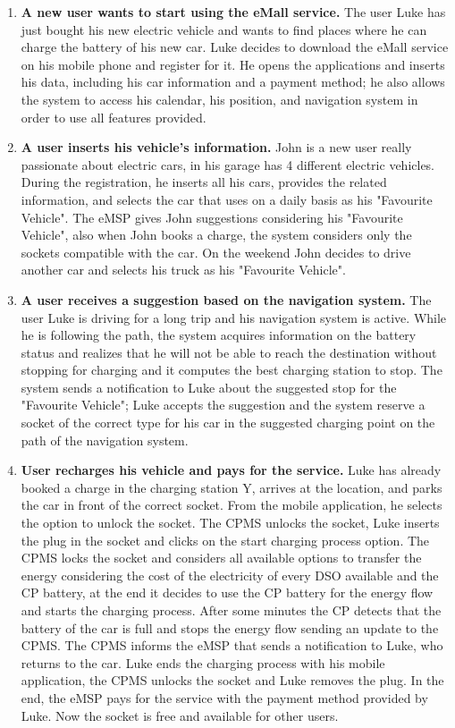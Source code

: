 \documentclass{Configuration_Files/PoliMi3i_thesis}
\begin{document}
\begin{enumerate}
    \item \textbf{A new user wants to start using the eMall service.} 
    The user Luke has just bought his new electric vehicle and wants to find places where he can charge the battery of his new car. Luke decides to download the eMall service on his mobile phone and register for it. He opens the applications and inserts his data, including his car information and a payment method; he also allows the system to access his calendar, his position, and navigation system in order to use all features provided.

    \item \textbf{A user inserts his vehicle's information.} 
    John is a new user really passionate about electric cars, in his garage has 4 different electric vehicles. During the registration, he inserts all his cars, provides the related information, and selects the car that uses on a daily basis as his "Favourite Vehicle". The eMSP gives John suggestions considering his "Favourite Vehicle", also when John books a charge, the system considers only the sockets compatible with the car. On the weekend John decides to drive another car and selects his truck as his "Favourite Vehicle".

    \item \textbf{A user receives a suggestion based on the navigation system.} \newline
    The user Luke is driving for a long trip and his navigation system is active. While he is following the path, the system acquires information on the battery status and realizes that he will not be able to reach the destination without stopping for charging and it computes the best charging station to stop. The system sends a notification to Luke about the suggested stop for the "Favourite Vehicle"; Luke accepts the suggestion and the system reserve a socket of the correct type for his car in the suggested charging point on the path of the navigation system.

    \item \textbf{User recharges his vehicle and pays for the service.} \newline
    Luke has already booked a charge in the charging station Y, arrives at the location, and parks the car in front of the correct socket. From the mobile application, he selects the option to unlock the socket. The CPMS unlocks the socket, Luke inserts the plug in the socket and clicks on the start charging process option. The CPMS locks the socket and considers all available options to transfer the energy considering the cost of the electricity of every DSO available and the CP battery, at the end it decides to use the CP battery for the energy flow and starts the charging process. After some minutes the CP detects that the battery of the car is full and stops the energy flow sending an update to the CPMS. The CPMS informs the eMSP that sends a notification to Luke, who returns to the car. Luke ends the charging process with his mobile application, the CPMS unlocks the socket and Luke removes the plug. In the end, the eMSP pays for the service with the payment method provided by Luke. Now the socket is free and available for other users.


\end{enumerate}
\end{document}
